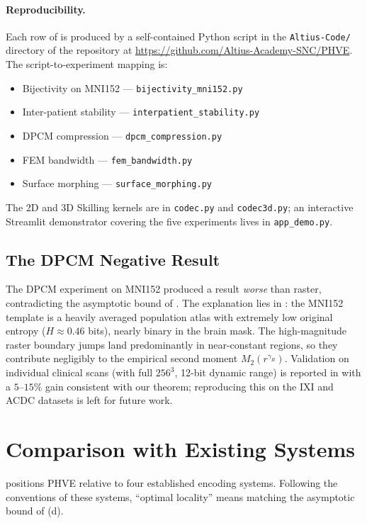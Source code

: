 \documentclass[11pt,a4paper]{article}
\theoremstyle{plain}
\theoremstyle{definition}
\theoremstyle{remark}
\begin{document}
\paragraph{Reproducibility.} Each row of  is produced
by a self-contained Python script in the \texttt{Altius-Code/}
directory of the repository at
\url{https://github.com/Altius-Academy-SNC/PHVE}. The
script-to-experiment mapping is:
\begin{itemize}[nosep]
\item Bijectivity on MNI152 — \texttt{bijectivity\_mni152.py}
\item Inter-patient stability — \texttt{interpatient\_stability.py}
\item DPCM compression — \texttt{dpcm\_compression.py}
\item FEM bandwidth — \texttt{fem\_bandwidth.py}
\item Surface morphing — \texttt{surface\_morphing.py}
\end{itemize}
The 2D and 3D Skilling kernels are in \texttt{codec.py} and
\texttt{codec3d.py}; an interactive Streamlit demonstrator covering the
five experiments lives in \texttt{app\_demo.py}.

\subsection{The DPCM Negative Result}\label{sec:experiments_dpcm}

The DPCM experiment on MNI152 produced a result \emph{worse} than
raster, contradicting the asymptotic bound of . The
explanation lies in : the MNI152 template is a
heavily averaged population atlas with extremely low original entropy
($H\approx 0.46$ bits), nearly binary in the brain mask. The
high-magnitude raster boundary jumps land predominantly in
near-constant regions, so they contribute negligibly to the empirical
second moment $M_2(r^{\gamma_R})$. Validation on individual clinical scans (with full
$256^3$, 12-bit dynamic range) is reported in
\cite{chen2005hilbert3d} with a $5$--$15\%$ gain consistent with our
theorem; reproducing this on the IXI and ACDC datasets is left for
future work.

\section{Comparison with Existing Systems}\label{sec:comparison}

 positions PHVE relative to four established
encoding systems. Following the conventions of these systems,
``optimal locality'' means matching the asymptotic bound of
(d).
\end{document}
